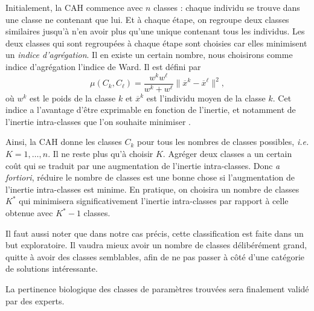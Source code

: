 Initialement, la CAH commence avec $n$ classes : chaque individu se trouve dans une classe ne contenant que lui.
Et à chaque étape, on regroupe deux classes similaires jusqu'à n'en avoir plus qu'une unique contenant tous les individus.
Les deux classes qui sont regroupées à chaque étape sont choisies car elles minimisent un \emph{indice d'agrégation}.
Il en existe un certain nombre, nous choisirons comme indice d'agrégation l'indice de Ward.
Il est défini par
\[
\mu\left( C_k, C_{\ell} \right) = \frac{w^kw^{\ell}}{w^k + w^{\ell}}\lVert \overline{x}^k - \overline{x}^{\ell} \rVert^2,
\]
où $w^k$ est le poids de la classe $k$ et $\overline{x}^k$ est l'individu moyen de la classe $k$.
Cet indice a l'avantage d'être exprimable en fonction de l'inertie, et notamment de l'inertie intra-classes que l'on souhaite minimiser \citep{bry}.

Ainsi, la CAH donne les classes $C_k$ pour tous les nombres de classes possibles, \emph{i.e.} $K = 1,\ldots, n$.
Il ne reste plus qu'à choisir $K$.
Agréger deux classes a un certain coût qui se traduit par une augmentation de l'inertie intra-classes.
Donc \emph{a fortiori}, réduire le nombre de classes est une bonne chose si l'augmentation de l'inertie intra-classes est minime.
En pratique, on choisira un nombre de classes $K^*$ qui minimisera significativement l'inertie intra-classes par rapport à celle obtenue avec $K^* -1$ classes.

Il faut aussi noter que dans notre cas précis, cette classification est faite dans un but exploratoire. 
Il vaudra mieux avoir un nombre de classes délibérément grand, quitte à avoir des classes semblables, afin de ne pas passer à côté d'une catégorie de solutions intéressante.

La pertinence biologique des classes de paramètres trouvées sera finalement validé par des experts.




